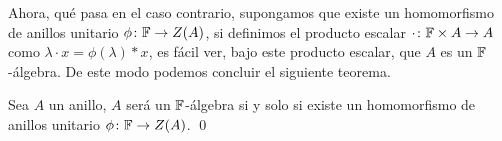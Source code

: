 Ahora, qué pasa en el caso contrario, supongamos que existe un homomorfismo de anillos unitario $\phi\colon \mathbb{F} \to Z(A)$, si definimos el producto escalar $\cdot \colon \mathbb{F}\times A \to A$ como $\lambda \cdot x = \phi(\lambda) * x$, es fácil ver, bajo este producto escalar, que $A$ es un $\mathbb{F}$-álgebra. De este modo podemos concluir el siguiente teorema.

\begin{teor}
  Sea $A$ un anillo, $A$ será un $\mathbb{F}$-álgebra si y solo si existe un homomorfismo de anillos unitario $\phi\colon \mathbb{F} \to Z(A)$. \qed
\end{teor}